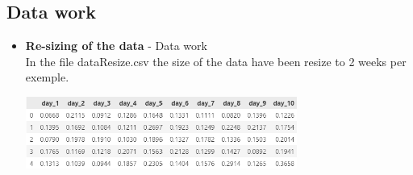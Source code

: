 \documentclass[letterpaper,11pt]{article}
\begin{document}
\subsection*{Data work}
\begin{itemize}
  \item \textbf{Re-sizing of the data} - Data work\\
  In the file dataResize.csv the size of the data have been resize to 2 weeks per exemple.
    \begin{center}
    \includegraphics[width=0.7\textwidth]{img/dataR.png}
    \end{center}


\end{itemize}
\end{document}
